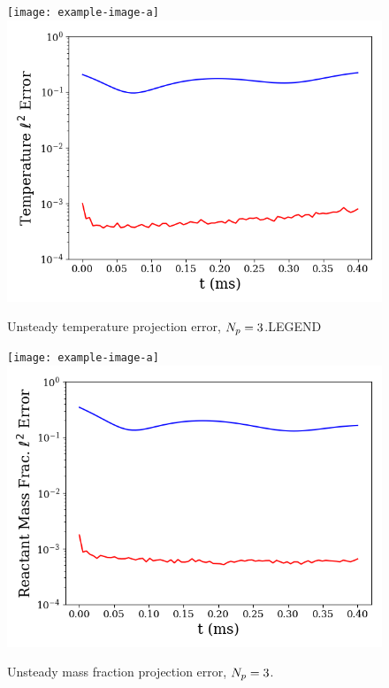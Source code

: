 %
\begin{figure}
    \begin{minipage}{0.45\linewidth}
        \ifdefined\DRAFT
		    \texttt{[image: example-image-a]}
	    \else
		    \includegraphics[width=0.99\linewidth]{Chapters/ProjROMs/Images/temp_error.png}
        \fi
        \caption{\label{fig:projErrTempTime}Unsteady temperature projection error, $N_p = 3$.{\color{red}LEGEND}}
    \end{minipage}
    \hspace{1em}
    \begin{minipage}{0.45\linewidth}
        \ifdefined\DRAFT
		    \texttt{[image: example-image-a]}
	    \else
		    \includegraphics[width=0.99\linewidth]{Chapters/ProjROMs/Images/mf_error.png}
        \fi
        \caption{\label{fig:projErrMFTime}Unsteady mass fraction projection error, $N_p = 3$.}
    \end{minipage}
\end{figure}
%


